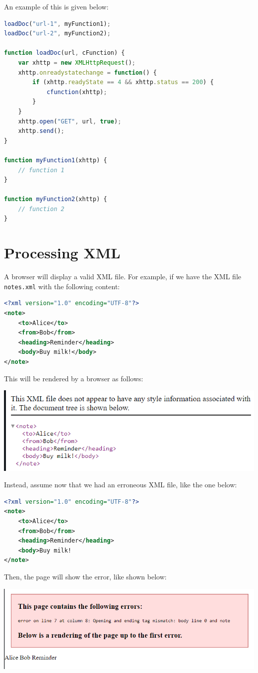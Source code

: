 \documentclass[a4paper, openany]{memoir}
\begin{document}
An example of this is given below:
\begin{lstlisting}[language=javascript]
loadDoc("url-1", myFunction1);
loadDoc("url-2", myFunction2);

function loadDoc(url, cFunction) {
    var xhttp = new XMLHttpRequest();
    xhttp.onreadystatechange = function() {
        if (xhttp.readyState == 4 && xhttp.status == 200) {
            cfunction(xhttp);
        }
    }
    xhttp.open("GET", url, true);
    xhttp.send();
}

function myFunction1(xhttp) {
    // function 1
}

function myFunction2(xhttp) {
    // function 2
}
\end{lstlisting}
\newpage

\section{Processing XML}
A browser will display a valid XML file. For example, if we have the XML file \texttt{notes.xml} with the following content:
\begin{lstlisting}[language=xml]
<?xml version="1.0" encoding="UTF-8"?>
<note>
    <to>Alice</to>
    <from>Bob</from>
    <heading>Reminder</heading>
    <body>Buy milk!</body>
</note>
\end{lstlisting}
This will be rendered by a browser as follows:
\begin{center}
    \includegraphics[scale=0.7]{src/XML1.PNG}
\end{center}
Instead, assume now that we had an erroneous XML file, like the one below:
\begin{lstlisting}[language=xml]
<?xml version="1.0" encoding="UTF-8"?>
<note>
    <to>Alice</to>
    <from>Bob</from>
    <heading>Reminder</heading>
    <body>Buy milk!
</note>
\end{lstlisting}
Then, the page will show the error, like shown below:
\begin{center}
    \includegraphics[scale=0.7]{src/XML2.PNG}
\end{center}
\end{document}
